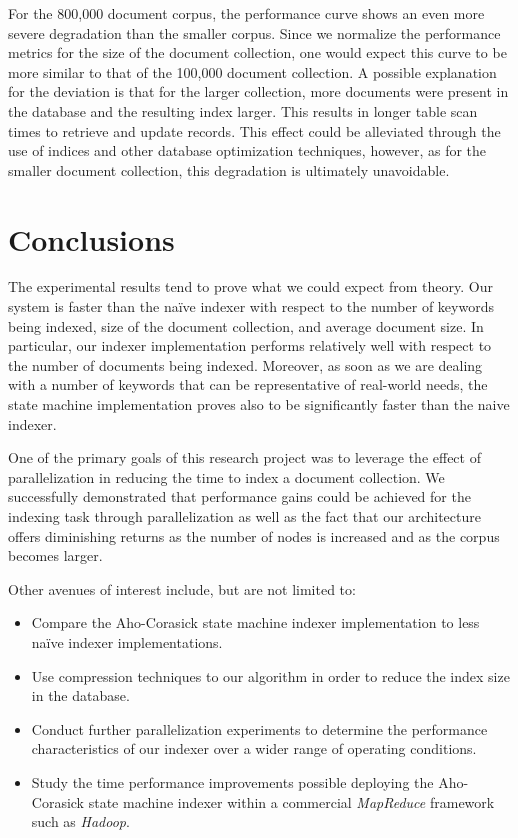 \documentclass[10pt]{report}
\begin{document}
For the 800,000 document corpus, the performance curve shows an even
more severe degradation than the smaller corpus. Since we normalize
the performance metrics for the size of the document collection, one
would expect this curve to be more similar to that of the 100,000
document collection. A possible explanation for the deviation is that
for the larger collection, more documents were present in the
database and the resulting index larger. This results in longer table
scan times to retrieve and update records. This effect could be
alleviated through the use of indices and other database optimization
techniques, however, as for the smaller document
collection, this degradation is ultimately unavoidable.


\section{Conclusions}
\label{sec:conclusions}
The experimental results tend to prove what we could expect from
theory. Our system is faster than the na\"{i}ve indexer with respect
to the number of keywords being indexed, size of the document
collection, and average document size. In particular, our indexer
implementation performs relatively well with respect to the number of
documents being indexed. Moreover, as soon as we are dealing with a number of
keywords that can be representative of real-world needs, the state
machine implementation proves also to be significantly faster than the
naive indexer. 

One of the primary goals of this research project was to leverage the
effect of parallelization in reducing the time to index a document
collection. We successfully demonstrated that performance gains could
be achieved for the indexing task through parallelization as well as
the fact that our architecture offers diminishing returns as the
number of nodes is increased and as the corpus becomes larger.

 Other avenues of interest include, but are not limited
to:

\begin{itemize}
  \item Compare the Aho-Corasick state machine indexer implementation
    to less na\"{i}ve indexer implementations.
    
    \item Use compression techniques to our algorithm in order to
      reduce the index size in the database.

      \item Conduct further parallelization experiments to determine
        the performance characteristics of our indexer over a wider
        range of operating conditions.

    \item Study the time performance improvements possible deploying
      the Aho-Corasick state machine indexer within a commercial
      \textit{MapReduce} framework such as \textit{Hadoop}.
\end{itemize}



\renewcommand\bibname{References}




\end{document}
